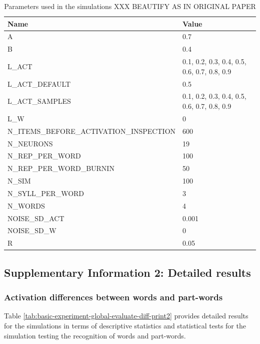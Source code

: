 \documentclass[
]{article}
\begin{document}
\begin{table}

\caption{\label{tab:list-parameters2}\label{tab:params}Parameters used in the simulations XXX BEAUTIFY AS IN ORIGINAL PAPER}
\centering
\begin{tabular}[t]{ll}
\toprule
Name & Value\\
\midrule
A & 0.7\\
B & 0.4\\
L\_ACT & 0.1, 0.2, 0.3, 0.4, 0.5, 0.6, 0.7, 0.8, 0.9\\
L\_ACT\_DEFAULT & 0.5\\
L\_ACT\_SAMPLES & 0.1, 0.2, 0.3, 0.4, 0.5, 0.6, 0.7, 0.8, 0.9\\
\addlinespace
L\_W & 0\\
N\_ITEMS\_BEFORE\_ACTIVATION\_INSPECTION & 600\\
N\_NEURONS & 19\\
N\_REP\_PER\_WORD & 100\\
N\_REP\_PER\_WORD\_BURNIN & 50\\
\addlinespace
N\_SIM & 100\\
N\_SYLL\_PER\_WORD & 3\\
N\_WORDS & 4\\
NOISE\_SD\_ACT & 0.001\\
NOISE\_SD\_W & 0\\
\addlinespace
R & 0.05\\
\bottomrule
\end{tabular}
\end{table}

\clearpage

\hypertarget{supplementary-information-2-detailed-results}{%
\subsection{Supplementary Information 2: Detailed
results}\label{supplementary-information-2-detailed-results}}

\hypertarget{activation-differences-between-words-and-part-words}{%
\subsubsection{Activation differences between words and
part-words}\label{activation-differences-between-words-and-part-words}}

Table \ref{tab:basic-experiment-global-evaluate-diff-print2} provides
detailed results for the simulations in terms of descriptive statistics
and statistical tests for the simulation testing the recognition of
words and part-words.
\end{document}
